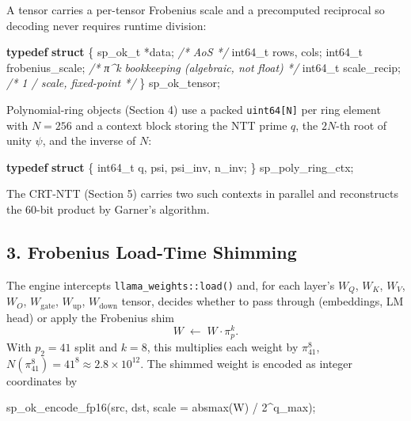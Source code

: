 \documentclass[
  11pt,
]{article}
\newenvironment{Shaded}{}{}
\newcommand{\CommentTok}[1]{\textcolor[rgb]{0.38,0.63,0.69}{\textit{#1}}}
\newcommand{\DataTypeTok}[1]{\textcolor[rgb]{0.56,0.13,0.00}{#1}}
\newcommand{\DecValTok}[1]{\textcolor[rgb]{0.25,0.63,0.44}{#1}}
\newcommand{\KeywordTok}[1]{\textcolor[rgb]{0.00,0.44,0.13}{\textbf{#1}}}
\newcommand{\NormalTok}[1]{#1}
\begin{document}
A tensor carries a per-tensor Frobenius scale and a precomputed
reciprocal so decoding never requires runtime division:

\begin{Shaded}
\begin{Highlighting}[]
\KeywordTok{typedef} \KeywordTok{struct}\NormalTok{ \{}
\NormalTok{    sp\_ok\_t  *data;             }\CommentTok{/* AoS */}
    \DataTypeTok{int64\_t}\NormalTok{   rows, cols;}
    \DataTypeTok{int64\_t}\NormalTok{   frobenius\_scale;  }\CommentTok{/* π\^{}k bookkeeping (algebraic, not float) */}
    \DataTypeTok{int64\_t}\NormalTok{   scale\_recip;      }\CommentTok{/* 1 / scale, fixed{-}point */}
\NormalTok{\} sp\_ok\_tensor;}
\end{Highlighting}
\end{Shaded}

Polynomial-ring objects (Section 4) use a packed \texttt{uint64{[}N{]}}
per ring element with \(N=256\) and a context block storing the NTT
prime \(q\), the \(2N\)-th root of unity \(\psi\), and the inverse of
\(N\):

\begin{Shaded}
\begin{Highlighting}[]
\KeywordTok{typedef} \KeywordTok{struct}\NormalTok{ \{}
    \DataTypeTok{int64\_t}\NormalTok{ q, psi, psi\_inv, n\_inv;}
\NormalTok{\} sp\_poly\_ring\_ctx;}
\end{Highlighting}
\end{Shaded}

The CRT-NTT (Section 5) carries two such contexts in parallel and
reconstructs the 60-bit product by Garner's algorithm.

\hypertarget{frobenius-load-time-shimming}{%
\subsection{3. Frobenius Load-Time
Shimming}\label{frobenius-load-time-shimming}}

The engine intercepts \texttt{llama\_weights::load()} and, for each
layer's \(W_Q\), \(W_K\), \(W_V\), \(W_O\), \(W_{\mathrm{gate}}\),
\(W_{\mathrm{up}}\), \(W_{\mathrm{down}}\) tensor, decides whether to
pass through (embeddings, LM head) or apply the Frobenius shim
\[W \;\longleftarrow\; W \cdot \pi_p^k.\] With \(p_2 = 41\) split and
\(k = 8\), this multiplies each weight by \(\pi_{41}^8\),
\(N(\pi_{41}^8) = 41^8 \approx 2.8 \times 10^{12}\). The shimmed weight
is encoded as integer coordinates by

\begin{Shaded}
\begin{Highlighting}[]
\NormalTok{sp\_ok\_encode\_fp16(src, dst, scale = absmax(W) / }\DecValTok{2}\NormalTok{\^{}q\_max);}
\end{Highlighting}
\end{Shaded}
\end{document}
